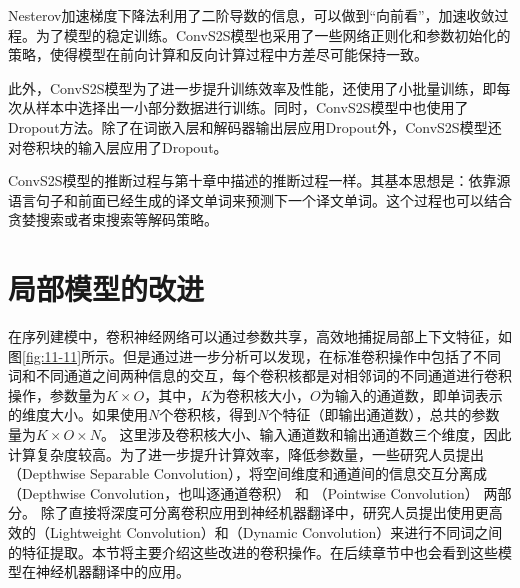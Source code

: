 \parinterval Nesterov加速梯度下降法利用了二阶导数的信息，可以做到“向前看”，加速收敛过程。为了模型的稳定训练。ConvS2S模型也采用了一些网络正则化和参数初始化的策略，使得模型在前向计算和反向计算过程中方差尽可能保持一致。

\parinterval 此外，ConvS2S模型为了进一步提升训练效率及性能，还使用了小批量训练，即每次从样本中选择出一小部分数据进行训练。同时，ConvS2S模型中也使用了Dropout方法。除了在词嵌入层和解码器输出层应用Dropout外，ConvS2S模型还对卷积块的输入层应用了Dropout。

\parinterval ConvS2S模型的推断过程与第十章中描述的推断过程一样。其基本思想是：依靠源语言句子和前面已经生成的译文单词来预测下一个译文单词。这个过程也可以结合贪婪搜索或者束搜索等解码策略。


\section{局部模型的改进}

\parinterval 在序列建模中，卷积神经网络可以通过参数共享，高效地捕捉局部上下文特征，如图\ref{fig:11-11}所示。但是通过进一步分析可以发现，在标准卷积操作中包括了不同词和不同通道之间两种信息的交互，每个卷积核都是对相邻词的不同通道进行卷积操作，参数量为$K \times O$，其中，$K$为卷积核大小，$O$为输入的通道数，即单词表示的维度大小。如果使用$N$个卷积核，得到$N$个特征（即输出通道数），总共的参数量为$K \times O \times N$。 这里涉及卷积核大小、输入通道数和输出通道数三个维度，因此计算复杂度较高。为了进一步提升计算效率，降低参数量，一些研究人员提出{\small{}}（Depthwise Separable Convolution），将空间维度和通道间的信息交互分离成{\small{}}（Depthwise Convolution，也叫逐通道卷积） 和{\small{}} （Pointwise Convolution） 两部分。 除了直接将深度可分离卷积应用到神经机器翻译中，研究人员提出使用更高效的{\small{}}（Lightweight Convolution）和{\small{}}（Dynamic Convolution）来进行不同词之间的特征提取。本节将主要介绍这些改进的卷积操作。在后续章节中也会看到这些模型在神经机器翻译中的应用。

